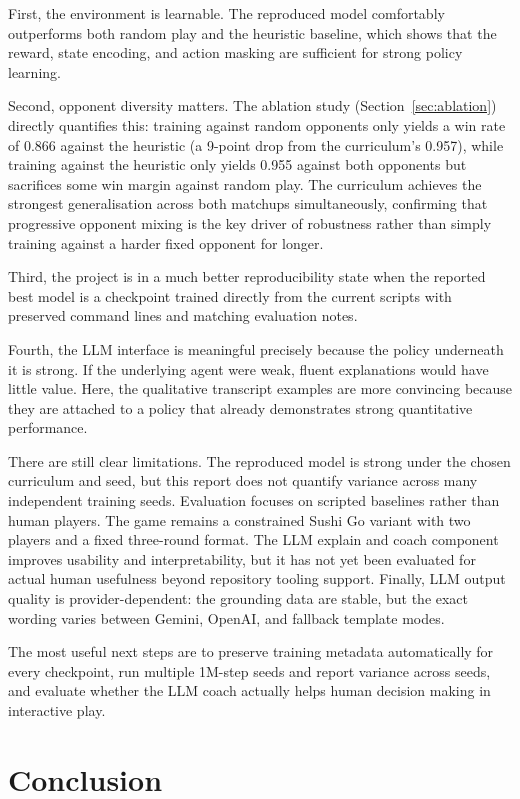 \documentclass[10pt]{article}
\begin{document}
First, the environment is learnable. The reproduced model comfortably outperforms both random play and the heuristic baseline, which shows that the reward, state encoding, and action masking are sufficient for strong policy learning.

Second, opponent diversity matters. The ablation study (Section~\ref{sec:ablation}) directly quantifies this: training against random opponents only yields a win rate of 0.866 against the heuristic (a 9-point drop from the curriculum's 0.957), while training against the heuristic only yields 0.955 against both opponents but sacrifices some win margin against random play. The curriculum achieves the strongest generalisation across both matchups simultaneously, confirming that progressive opponent mixing is the key driver of robustness rather than simply training against a harder fixed opponent for longer.

Third, the project is in a much better reproducibility state when the reported best model is a checkpoint trained directly from the current scripts with preserved command lines and matching evaluation notes.

Fourth, the LLM interface is meaningful precisely because the policy underneath it is strong. If the underlying agent were weak, fluent explanations would have little value. Here, the qualitative transcript examples are more convincing because they are attached to a policy that already demonstrates strong quantitative performance.

There are still clear limitations. The reproduced model is strong under the chosen curriculum and seed, but this report does not quantify variance across many independent training seeds. Evaluation focuses on scripted baselines rather than human players. The game remains a constrained Sushi Go variant with two players and a fixed three-round format. The LLM explain and coach component improves usability and interpretability, but it has not yet been evaluated for actual human usefulness beyond repository tooling support. Finally, LLM output quality is provider-dependent: the grounding data are stable, but the exact wording varies between Gemini, OpenAI, and fallback template modes.

The most useful next steps are to preserve training metadata automatically for every checkpoint, run multiple 1M-step seeds and report variance across seeds, and evaluate whether the LLM coach actually helps human decision making in interactive play.

\section{Conclusion}
\end{document}
